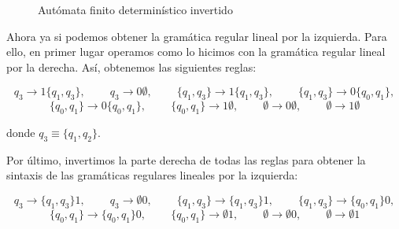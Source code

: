 \documentclass[10pt,a4paper,spanish]{report}
\begin{document}
\begin{enumerate}[1.]
\begin{enumerate}[a)]
\begin{figure}
\centering

\caption{Autómata finito determinístico invertido}
\label{inverder}
\end{figure}

Ahora ya si podemos obtener la gramática regular lineal por la izquierda. Para ello, en primer lugar operamos como lo hicimos con la gramática regular lineal por la derecha. Así, obtenemos las siguientes reglas:

\begin{displaymath}
q_3 \rightarrow 1\{q_1, q_3\}, \qquad\ q_3 \rightarrow 0\emptyset, \qquad\ \{q_1, q_3\} \rightarrow 1\{q_1, q_3\}, \qquad\ \{q_1, q_3\} \rightarrow 0\{q_0, q_1\},
\end{displaymath}
\begin{displaymath}
\{q_0, q_1\} \rightarrow 0\{q_0, q_1\}, \qquad\ \{q_0,q_1\} \rightarrow 1\emptyset, \qquad\ \emptyset \rightarrow 0\emptyset, \qquad\ \emptyset \rightarrow 1\emptyset
\end{displaymath}

donde $q_3 \equiv \{q_1,q_2\}$.

Por último, invertimos la parte derecha de todas las reglas para obtener la sintaxis de las gramáticas regulares lineales por la izquierda:

\begin{displaymath}
q_3 \rightarrow \{q_1, q_3\}1, \qquad\ q_3 \rightarrow \emptyset0, \qquad\ \{q_1, q_3\} \rightarrow \{q_1, q_3\}1, \qquad\ \{q_1, q_3\} \rightarrow \{q_0, q_1\}0,
\end{displaymath}
\begin{displaymath}
\{q_0, q_1\} \rightarrow \{q_0, q_1\}0, \qquad\ \{q_0,q_1\} \rightarrow \emptyset1, \qquad\ \emptyset \rightarrow \emptyset0, \qquad\ \emptyset \rightarrow \emptyset1
\end{displaymath}

\end{enumerate}

\end{enumerate}

\newpage
\thispagestyle{empty}

\\[2.5cm]
\end{document}
